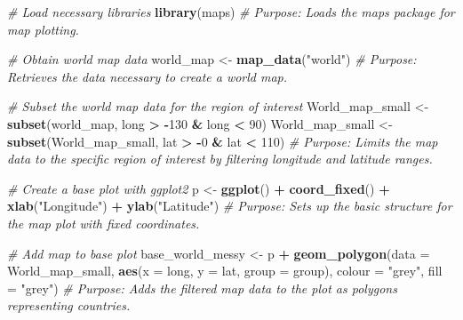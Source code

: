 \documentclass[
  11pt,
]{article}
\newenvironment{Shaded}{\begin{snugshade}}{\end{snugshade}}
\newcommand{\AttributeTok}[1]{\textcolor[rgb]{0.13,0.29,0.53}{#1}}
\newcommand{\CommentTok}[1]{\textcolor[rgb]{0.56,0.35,0.01}{\textit{#1}}}
\newcommand{\DecValTok}[1]{\textcolor[rgb]{0.00,0.00,0.81}{#1}}
\newcommand{\FunctionTok}[1]{\textcolor[rgb]{0.13,0.29,0.53}{\textbf{#1}}}
\newcommand{\NormalTok}[1]{#1}
\newcommand{\OtherTok}[1]{\textcolor[rgb]{0.56,0.35,0.01}{#1}}
\newcommand{\SpecialCharTok}[1]{\textcolor[rgb]{0.81,0.36,0.00}{\textbf{#1}}}
\newcommand{\StringTok}[1]{\textcolor[rgb]{0.31,0.60,0.02}{#1}}
\begin{document}
\begin{Shaded}
\begin{Highlighting}[]
\CommentTok{\# Load necessary libraries}
\FunctionTok{library}\NormalTok{(maps)}
\CommentTok{\# Purpose: Loads the \textasciigrave{}maps\textasciigrave{} package for map plotting.}

\CommentTok{\# Obtain world map data}
\NormalTok{world\_map }\OtherTok{\textless{}{-}} \FunctionTok{map\_data}\NormalTok{(}\StringTok{"world"}\NormalTok{)}
\CommentTok{\# Purpose: Retrieves the data necessary to create a world map.}

\CommentTok{\# Subset the world map data for the region of interest}
\NormalTok{World\_map\_small }\OtherTok{\textless{}{-}} \FunctionTok{subset}\NormalTok{(world\_map, long }\SpecialCharTok{\textgreater{}} \SpecialCharTok{{-}}\DecValTok{130} \SpecialCharTok{\&}\NormalTok{ long }\SpecialCharTok{\textless{}} \DecValTok{90}\NormalTok{)}
\NormalTok{World\_map\_small }\OtherTok{\textless{}{-}} \FunctionTok{subset}\NormalTok{(World\_map\_small, lat }\SpecialCharTok{\textgreater{}} \SpecialCharTok{{-}}\DecValTok{0} \SpecialCharTok{\&}\NormalTok{ lat }\SpecialCharTok{\textless{}} \DecValTok{110}\NormalTok{)}
\CommentTok{\# Purpose: Limits the map data to the specific region of interest by filtering longitude and latitude ranges.}

\CommentTok{\# Create a base plot with ggplot2}
\NormalTok{p }\OtherTok{\textless{}{-}} \FunctionTok{ggplot}\NormalTok{() }\SpecialCharTok{+} \FunctionTok{coord\_fixed}\NormalTok{() }\SpecialCharTok{+}
  \FunctionTok{xlab}\NormalTok{(}\StringTok{"Longitude"}\NormalTok{) }\SpecialCharTok{+} \FunctionTok{ylab}\NormalTok{(}\StringTok{"Latitude"}\NormalTok{)}
\CommentTok{\# Purpose: Sets up the basic structure for the map plot with fixed coordinates.}

\CommentTok{\# Add map to base plot}
\NormalTok{base\_world\_messy }\OtherTok{\textless{}{-}}\NormalTok{ p }\SpecialCharTok{+} \FunctionTok{geom\_polygon}\NormalTok{(}\AttributeTok{data =}\NormalTok{ World\_map\_small, }\FunctionTok{aes}\NormalTok{(}\AttributeTok{x =}\NormalTok{ long, }
                                                                 \AttributeTok{y =}\NormalTok{ lat, }
                                                                 \AttributeTok{group =}\NormalTok{ group), }
                                     \AttributeTok{colour =} \StringTok{"grey"}\NormalTok{, }\AttributeTok{fill =} \StringTok{"grey"}\NormalTok{)}
\CommentTok{\# Purpose: Adds the filtered map data to the plot as polygons representing countries.}


\end{Highlighting}
\end{Shaded}
\end{document}

